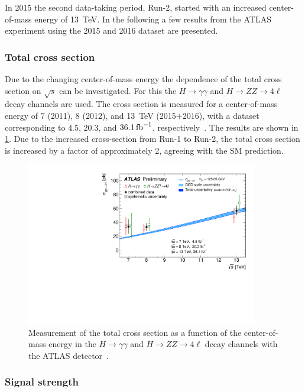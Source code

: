 In 2015 the second data-taking period, Run-2, started with an increased center-of-mass energy of \SI{13}{\TeV}.
In the following a few results from the ATLAS experiment using the 2015 and 2016 dataset are presented.

\subsubsection{Total cross section}\label{subsub:theory:meas:run2:totalxsec}

Due to the changing center-of-mass energy the dependence of the total cross section on $\sqrt{s}$ can be investigated.
For this the $H\to\gamma\gamma$ and $H \to ZZ \to 4\ell$ decay channels are used.
The cross section is measured for a center-of-mass energy of $7$ (2011), $8$ (2012), and \SI{13}{\TeV} (2015+2016),
with a dataset corresponding to $4.5$, $20.3$, and $\SI{36.1}{\invfb}$, respectively~\cite{ATLAS-CONF-2017-047}.
The results are shown in \cref{fig:theory:meas:run2:totalxsec}.
Due to the increased cross-section from Run-1 to Run-2, the total cross section is increased by a factor of approximately 2,
agreeing with the SM prediction.

\begin{figure}[htb]
    \centering
    \includegraphics[width=0.9\textwidth]{./figures/theory/total_xsec_run2.pdf}
    \caption{Measurement of the total cross section as a function of the center-of-mass energy in the $H \to \gamma\gamma$
             and $H \to ZZ \to 4\ell$ decay channels with the ATLAS detector~\cite{ATLAS-CONF-2017-047}.}\label{fig:theory:meas:run2:totalxsec}
\end{figure}

\subsubsection{Signal strength}\label{subsub:theory:meas:run2:mu}

